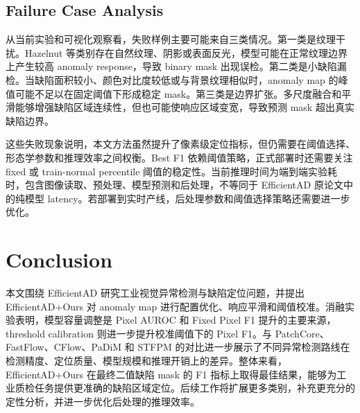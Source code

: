 \documentclass[letterpaper]{article}
\newcommand{\method}{EfficientAD+Ours}
\begin{document}
\subsection{Failure Case Analysis}

从当前实验和可视化观察看，失败样例主要可能来自三类情况。第一类是纹理干扰。Hazelnut 等类别存在自然纹理、阴影或表面反光，模型可能在正常纹理边界上产生较高 anomaly response，导致 binary mask 出现误检。第二类是小缺陷漏检。当缺陷面积较小、颜色对比度较低或与背景纹理相似时，anomaly map 的峰值可能不足以在固定阈值下形成稳定 mask。第三类是边界扩张。多尺度融合和平滑能够增强缺陷区域连续性，但也可能使响应区域变宽，导致预测 mask 超出真实缺陷边界。

这些失败现象说明，本文方法虽然提升了像素级定位指标，但仍需要在阈值选择、形态学参数和推理效率之间权衡。Best F1 依赖阈值策略，正式部署时还需要关注 fixed 或 train-normal percentile 阈值的稳定性。当前推理时间为端到端实验耗时，包含图像读取、预处理、模型预测和后处理，不等同于 EfficientAD 原论文中的纯模型 latency。若部署到实时产线，后处理参数和阈值选择策略还需要进一步优化。

\section{Conclusion}

本文围绕 EfficientAD 研究工业视觉异常检测与缺陷定位问题，并提出 \method{} 对 anomaly map 进行配置优化、响应平滑和阈值校准。消融实验表明，模型容量调整是 Pixel AUROC 和 Fixed Pixel F1 提升的主要来源，threshold calibration 则进一步提升校准阈值下的 Pixel F1。与 PatchCore、FastFlow、CFlow、PaDiM 和 STFPM 的对比进一步展示了不同异常检测路线在检测精度、定位质量、模型规模和推理开销上的差异。整体来看，\method{} 在最终二值缺陷 mask 的 F1 指标上取得最佳结果，能够为工业质检任务提供更准确的缺陷区域定位。后续工作将扩展更多类别，补充更充分的定性分析，并进一步优化后处理的推理效率。

\clearpage


\end{document}
